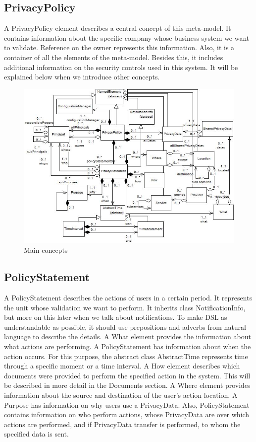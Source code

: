 \documentclass[11pt,english]{article}
\begin{document}
\subsection{PrivacyPolicy}
A PrivacyPolicy element describes a central concept of this meta-model. It contains information about the specific company whose business system we want to validate. Reference on the owner represents this information. Also, it is a container of all the elements of the meta-model. Besides this, it includes additional information on the security controls used in this system. It will be explained below when we introduce other concepts.
\begin{figure}[H]
    \centering
    \includegraphics[width=12.5cm]{images/mainconcepts.jpg}
    \caption{Main concepts}
    \label{fig:mainconcepts}
\end{figure}
\subsection{PolicyStatement}
A PolicyStatement describes the actions of users in a certain period. It represents the unit whose validation we want to perform. It inherits class NotificationInfo, but more on this later when we talk about notifications. To make DSL as understandable as possible, it should use prepositions and adverbs from natural language to describe the details. A What element provides the information about what actions are performing. A PolicyStatement has information about when the action occurs. For this purpose, the abstract class AbstractTime represents time through a specific moment or a time interval. A How element describes which documents were provided to perform the specified action in the system. This will be described in more detail in the Documents section. A Where element provides information about the source and destination of the user's action location. A Purpose has information on why users use a PrivacyData. Also, PolicyStatement contains information on who perform actions, whose PrivacyData are over which actions are performed, and if PrivacyData transfer is performed, to whom the specified data is sent.
\end{document}

